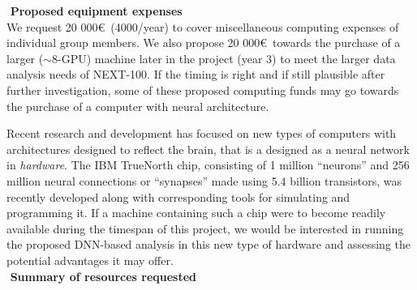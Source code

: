 \documentclass[11pt,a4paper]{article}
\begin{document}
\noindent\textbf{\textbullet\,\,Proposed equipment expenses}\\
We request 20 000\euro ~(4000/year) to cover miscellaneous computing expenses of individual group members. We also propose 20 000\euro ~towards the purchase of a larger ($\sim$8-GPU) machine later in the project (year 3) to meet the larger data analysis needs of NEXT-100. If the timing is right and if still plausible after further investigation, some of these proposed computing funds may go towards the purchase of a computer with neural architecture.

Recent research and development has focused on new types of computers with architectures designed to reflect the brain, that is a designed as a neural network in \emph{hardware}. The IBM TrueNorth \cite{TrueNorth} chip, consisting of 1 million ``neurons'' and 256 million neural connections or ``synapses'' made using 5.4 billion transistors, was recently developed along with corresponding tools for simulating and programming it. If a machine containing such a chip were to become readily available during the timespan of this project, we would be interested in running the proposed DNN-based analysis in this new type of hardware and assessing the potential advantages it may offer.\\

\noindent\textbf{\textbullet\,\,Summary of resources requested}\\
\end{document}

